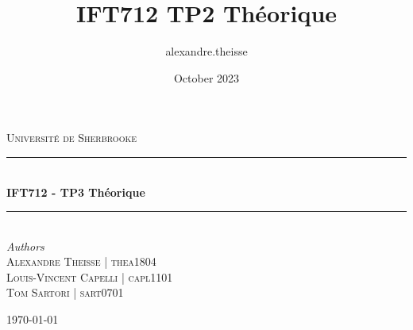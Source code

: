 \documentclass{article}
\title{IFT712 TP2 Théorique}
\author{alexandre.theisse }
\date{October 2023}
\begin{document}
\begin{titlepage} %
	\newcommand{\HRule}{\rule{\linewidth}{0.5mm}} %
	
	\center %
	
	
	\textsc{\LARGE Université de Sherbrooke}\\[1.5cm] %
	
	
	\HRule\\[0.4cm]
	
	{\huge\bfseries IFT712 - TP3 Théorique}\\[0.4cm]
	
	\HRule\\[1.5cm]
	

	{\large\textit{Authors}}\\
            \textsc{Alexandre Theisse | thea1804}\\
            \textsc{Louis-Vincent Capelli | capl1101}\\
            \textsc{Tom Sartori | sart0701}\\
	
	
	\vfill\vfill\vfill %
	
	{\large\today} %
	
	\vfill %
	
\end{titlepage}
\end{document}

